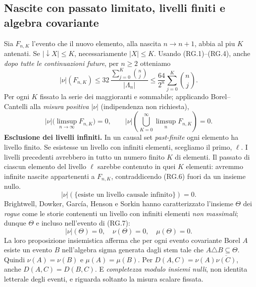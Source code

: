 \documentclass[11pt,a4paper]{article}
\begin{document}
\subsection*{Nascite con passato limitato, livelli finiti e algebra covariante}
Sia $F_{n,K}$ l'evento che il nuovo elemento, alla nascita $n\to n+1$, abbia al piu $K$ antenati. Se $|\downarrow X|\le K$, necessariamente $|X|\le K$. Usando (RG.1)--(RG.4), anche \emph{dopo tutte le continuazioni future}, per $n\ge2$ otteniamo
\begin{equation}
\boxed{\quad |\nu|(F_{n,K})\le
32\,\frac{\sum_{j=0}^{K}\binom nj}{|\Lambda_n|}
\le \frac{64}{2^n}\sum_{j=0}^{K}\binom nj.\quad}
\tag{RG.5}
\end{equation}
Per ogni $K$ fissato la serie dei maggioranti e sommabile; applicando Borel--Cantelli alla \emph{misura positiva} $|\nu|$ (indipendenza non richiesta),
\begin{equation}
|\nu|\bigl(\limsup_{n\to\infty}F_{n,K}\bigr)=0,
\qquad |\nu|\left(\bigcup_{K=0}^{\infty}\limsup_n F_{n,K}\right)=0.
\tag{RG.6}
\end{equation}
\textbf{Esclusione dei livelli infiniti.} In un causal set \emph{past-finite} ogni elemento ha livello finito. Se esistesse un livello con infiniti elementi, scegliamo il primo, $\ell$. I livelli precedenti avrebbero in tutto un numero finito $K$ di elementi. Il passato di ciascun elemento del livello $\ell$ sarebbe contenuto in quei $K$ elementi: avremmo infinite nascite appartenenti a $F_{n,K}$, contraddicendo (RG.6) fuori da un insieme nullo.
\begin{equation}
|\nu|(\{\text{esiste un livello causale infinito}\})=0.
\tag{RG.7}
\end{equation}
Brightwell, Dowker, Garc\'ia, Henson e Sorkin hanno caratterizzato l'insieme $\Theta$ dei \emph{rogue} come le storie contenenti un livello con infiniti elementi \emph{non massimali}; dunque $\Theta$ e incluso nell'evento di (RG.7):
\begin{equation}
\boxed{\quad |\nu|(\Theta)=0,\quad\nu(\Theta)=0,\quad\mu(\Theta)=0.\quad}
\tag{RG.8}
\end{equation}
La loro proposizione insiemistica afferma che per ogni evento covariante Borel $A$ esiste un evento $B$ nell'algebra sigma generata dagli stem tale che $A\triangle B\subseteq\Theta$. Quindi $\nu(A)=\nu(B)$ e $\mu(A)=\mu(B)$. Per $D(A,C)=\nu(A)\overline{\nu(C)}$, anche $D(A,C)=D(B,C)$. E \emph{completezza modulo insiemi nulli}, non identita letterale degli eventi, e riguarda soltanto la misura scalare fissata.
\end{document}
